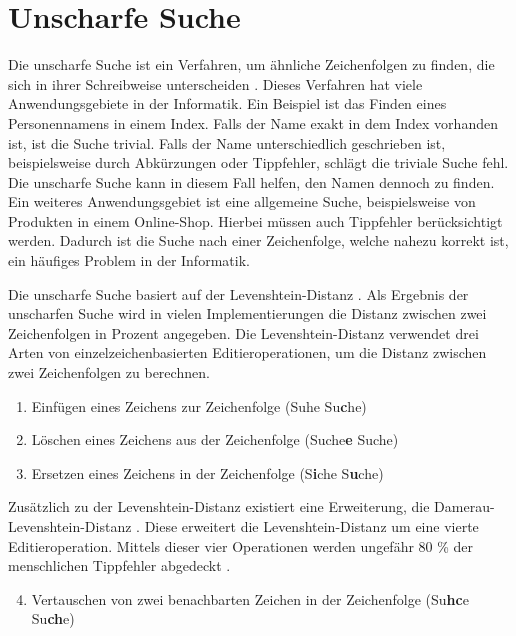 \section{Unscharfe Suche}
\label{sec:unscharfe-suche}
Die unscharfe Suche ist ein Verfahren, um ähnliche Zeichenfolgen zu finden, die sich in ihrer Schreibweise unterscheiden \autocite{hall_approximate_1980}.
Dieses Verfahren hat viele Anwendungsgebiete in der Informatik.
Ein Beispiel ist das Finden eines Personennamens in einem Index.
Falls der Name exakt in dem Index vorhanden ist, ist die Suche trivial.
Falls der Name unterschiedlich geschrieben ist, beispielsweise durch Abkürzungen oder Tippfehler, schlägt die triviale Suche fehl.
Die unscharfe Suche kann in diesem Fall helfen, den Namen dennoch zu finden.
Ein weiteres Anwendungsgebiet ist eine allgemeine Suche, beispielsweise von Produkten in einem Online-Shop.
Hierbei müssen auch Tippfehler berücksichtigt werden.
Dadurch ist die Suche nach einer Zeichenfolge, welche nahezu korrekt ist, ein häufiges Problem in der Informatik.

Die unscharfe Suche basiert auf der Levenshtein-Distanz \autocite{levenshtein_binary_1965}.
Als Ergebnis der unscharfen Suche wird in vielen Implementierungen die Distanz zwischen zwei Zeichenfolgen in Prozent angegeben.
Die Levenshtein-Distanz verwendet drei Arten von einzelzeichenbasierten Editieroperationen, um die Distanz zwischen zwei Zeichenfolgen zu berechnen.

\begin{enumerate}
    \item Einfügen eines Zeichens zur Zeichenfolge (Suhe \rightarrow{} Su\textbf{c}he)
    \item Löschen eines Zeichens aus der Zeichenfolge (Suche\textbf{e} \rightarrow{} Suche)
    \item Ersetzen eines Zeichens in der Zeichenfolge (S\textbf{i}che \rightarrow{} S\textbf{u}che)
\end{enumerate}

Zusätzlich zu der Levenshtein-Distanz existiert eine Erweiterung, die Damerau-Levenshtein-Distanz \autocite{damerau_technique_1964}.
Diese erweitert die Levenshtein-Distanz um eine vierte Editieroperation.
Mittels dieser vier Operationen werden ungefähr 80 \% der menschlichen Tippfehler abgedeckt \autocite{damerau_technique_1964}.

\begin{enumerate}
    \setcounter{enumi}{3}
    \item Vertauschen von zwei benachbarten Zeichen in der Zeichenfolge (Su\textbf{hc}e \rightarrow{} Su\textbf{ch}e)
\end{enumerate}


